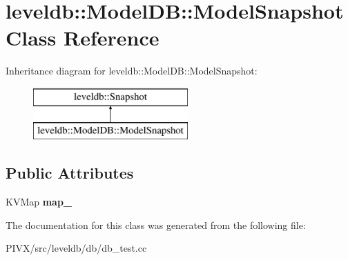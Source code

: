 \hypertarget{classleveldb_1_1_model_d_b_1_1_model_snapshot}{}\section{leveldb\+:\+:Model\+DB\+:\+:Model\+Snapshot Class Reference}
\label{classleveldb_1_1_model_d_b_1_1_model_snapshot}
Inheritance diagram for leveldb\+:\+:Model\+DB\+:\+:Model\+Snapshot\+:\begin{figure}[H]
\begin{center}
\leavevmode
\includegraphics[height=2.000000cm]{classleveldb_1_1_model_d_b_1_1_model_snapshot}
\end{center}
\end{figure}
\subsection*{Public Attributes}
\begin{DoxyCompactItemize}
\item 
\mbox{\label{classleveldb_1_1_model_d_b_1_1_model_snapshot_a7ae02397c293072b78874d0c073a10c5}} 
K\+V\+Map {\bfseries map\+\_\+}
\end{DoxyCompactItemize}


The documentation for this class was generated from the following file\+:\begin{DoxyCompactItemize}
\item 
P\+I\+V\+X/src/leveldb/db/db\+\_\+test.\+cc\end{DoxyCompactItemize}
